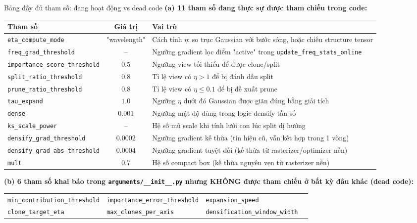 \begin{frame}{Bảng đầy đủ tham số: đang hoạt động vs dead code}
\scriptsize
\textbf{(a) 11 tham số đang thực sự được tham chiếu trong code:}
\begin{table}
\centering
\begin{tabular}{lc p{4.6cm}}
\toprule
\textbf{Tham số} & \textbf{Giá trị} & \textbf{Vai trò} \\
\midrule
\texttt{eta\_compute\_mode} & "wavelength" & Cách tính $\eta$: so trục Gaussian với bước sóng, hoặc chiếu structure tensor \\
\texttt{freq\_grad\_threshold} & -- & Ngưỡng gradient lọc điểm "active" trong \texttt{update\_freq\_stats\_online} \\
\texttt{importance\_score\_threshold} & $0.5$ & Ngưỡng view tối thiểu để được clone/split \\
\texttt{split\_ratio\_threshold} & $0.8$ & Tỉ lệ view có $\eta{>}1$ để bị đánh dấu split \\
\texttt{prune\_ratio\_threshold} & $0.8$ & Tỉ lệ view có $\eta{\le}0.1$ để bị đề xuất prune \\
\texttt{tau\_expand} & $1.0$ & Ngưỡng $\eta$ dưới đó Gaussian được giãn đúng bằng giải tích \\
\texttt{dense} & $0.001$ & Ngưỡng mật độ dùng trong logic densify tần số \\
\texttt{ks\_scale\_power} & -- & Hệ số mũ scale khi tính lưới con lúc split dị hướng \\
\texttt{densify\_grad\_threshold} & $0.0002$ & Ngưỡng gradient kế thừa (tín hiệu cũ, vẫn kết hợp trong 1 vòng) \\
\texttt{densify\_grad\_abs\_threshold} & $0.0004$ & Ngưỡng gradient tuyệt đối (kế thừa từ rasterizer/optimizer nền) \\
\texttt{mult} & $0.7$ & Hệ số compact box (kế thừa nguyên vẹn từ rasterizer nền) \\
\bottomrule
\end{tabular}
\end{table}
\vspace{-1mm}
\textbf{(b) 6 tham số khai báo trong \texttt{arguments/\_\_init\_\_.py} nhưng KHÔNG được tham chiếu ở bất kỳ đâu khác (dead code):}
\begin{center}
\begin{tabular}{llll}
\toprule
\texttt{min\_contribution\_threshold} & \texttt{importance\_error\_threshold} & \texttt{expansion\_speed} \\
\texttt{clone\_target\_eta} & \texttt{max\_clones\_per\_axis} & \texttt{densification\_window\_width} \\
\bottomrule
\end{tabular}
\end{center}
\end{frame}

